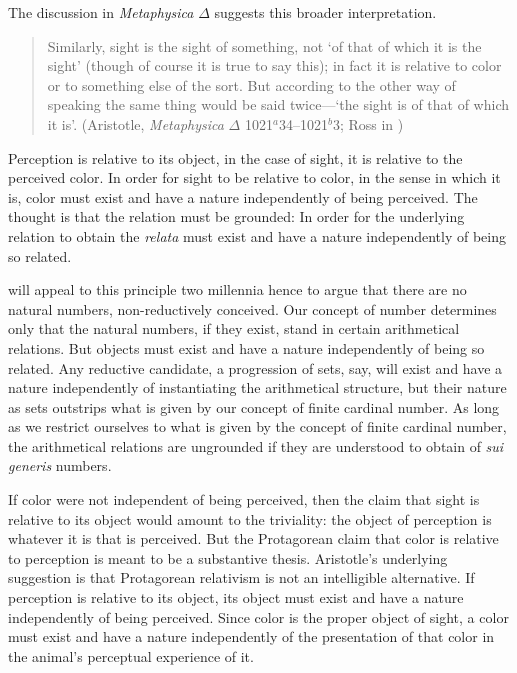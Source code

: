 The discussion in \emph{Metaphysica} \( \Delta \) suggests this broader interpretation.
\begin{quote}
	Similarly, sight is the sight of something, not `of that of which it is the sight' (though of course it is true to say this); in fact it is relative to color or to something else of the sort. But according to the other way of speaking the same thing would be said twice---`the sight is of that of which it is'. (Aristotle, \emph{Metaphysica} \( \Delta \) 1021\( ^{a} \)34--1021\( ^{b} \)3; Ross in \citealt[76]{Barnes:1984kx})
\end{quote}
Perception is relative to its object, in the case of sight, it is relative to the perceived color. In order for sight to be relative to color, in the sense in which it is, color must exist and have a nature independently of being perceived. The thought is that the relation must be grounded: In order for the underlying relation to obtain the \emph{relata} must exist and have a nature independently of being so related. 

\citet{Benacerraf:1965sh} will appeal to this principle two millennia hence to argue that there are no natural numbers, non-reductively conceived. Our concept of number determines only that the natural numbers, if they exist, stand in certain arithmetical relations. But objects must exist and have a nature independently of being so related. Any reductive candidate, a progression of sets, say, will exist and have a nature independently of instantiating the arithmetical structure, but their nature as sets outstrips what is given by our concept of finite cardinal number. As long as we restrict ourselves to what is given by the concept of finite cardinal number, the arithmetical relations are ungrounded if they are understood to obtain of \emph{sui generis} numbers.


If color were not independent of being perceived, then the claim that sight is relative to its object would amount to the triviality: the object of perception is whatever it is that is perceived. But the Protagorean claim that color is relative to perception is meant to be a substantive thesis. Aristotle's underlying suggestion is that Protagorean relativism is not an intelligible alternative. If perception is relative to its object, its object must exist and have a nature independently of being perceived. Since color is the proper object of sight, a color must exist and have a nature independently of the presentation of that color in the animal's perceptual experience of it.

